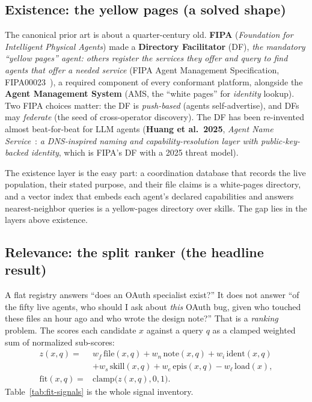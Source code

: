 \documentclass[11pt,a4paper]{article}
\theoremstyle{definition}
\theoremstyle{plain}
\begin{document}
\subsection{Existence: the yellow pages (a solved shape)}\label{sec:existence}

The canonical prior art is about a quarter-century old. \textbf{FIPA} (\emph{Foundation for
Intelligent Physical Agents}) made a \textbf{Directory Facilitator} (DF),
\emph{the mandatory ``yellow pages'' agent: others register the services they offer
and query to find agents that offer a needed service} (FIPA Agent Management
Specification, FIPA00023~), a required component of every conformant
platform, alongside the \textbf{Agent Management System} (AMS, the ``white pages'' for
\emph{identity} lookup). Two FIPA choices matter: the DF is \emph{push-based} (agents
self-advertise), and DFs may \emph{federate} (the seed of cross-operator discovery).
The DF has been re-invented almost beat-for-beat for LLM agents
(\textbf{Huang et al.\ 2025}, \emph{Agent Name Service}~: \emph{a
DNS-inspired naming and capability-resolution layer with public-key-backed identity},
which is FIPA's DF with a 2025 threat model).

The existence layer is the easy part: a coordination database that records the live
population, their stated purpose, and their file claims is a white-pages directory,
and a vector index that embeds each agent's declared capabilities and answers
nearest-neighbor queries is a yellow-pages directory over skills. The gap lies in
the layers above existence.

\subsection{Relevance: the split ranker (the headline result)}\label{sec:relevance}

A flat registry answers ``does an OAuth specialist exist?'' It does not answer ``of
the fifty live agents, who should I ask about \emph{this} OAuth bug, given who
touched these files an hour ago and who wrote the design note?'' That is a
\emph{ranking} problem. The  scores each candidate $x$
against a query $q$ as a clamped weighted sum of normalized sub-scores:
\begin{align}\label{eq:fit}
z(x,q) ={}& w_f\,\mathrm{file}(x,q) + w_n\,\mathrm{note}(x,q)
  + w_i\,\mathrm{ident}(x,q) \nonumber\\
 &+ w_s\,\mathrm{skill}(x,q) + w_e\,\mathrm{epis}(x,q)
  - w_\ell\,\mathrm{load}(x), \nonumber\\
\mathrm{fit}(x,q) ={}& \mathrm{clamp}\!\bigl(z(x,q),0,1\bigr).
\end{align}
Table~\ref{tab:fit-signals} is the whole signal inventory.
\end{document}
